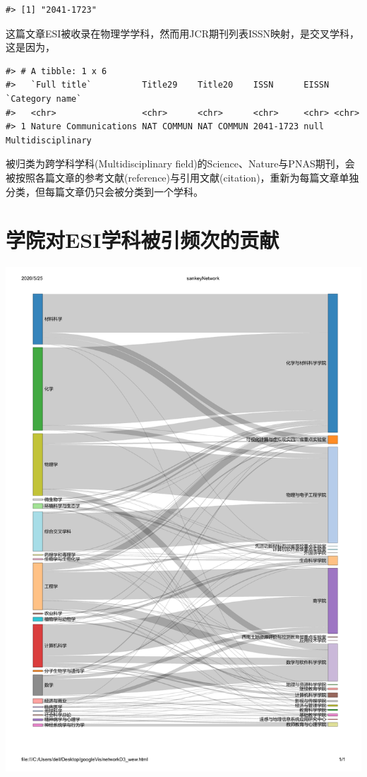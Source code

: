 \documentclass[cn, 11pt, fancy, hide]{elegantbook}
\begin{document}
\begin{verbatim}
#> [1] "2041-1723"
\end{verbatim}

这篇文章ESI被收录在物理学学科，然而用JCR期刊列表ISSN映射，是交叉学科，这是因为，

\begin{verbatim}
#> # A tibble: 1 x 6
#>   `Full title`          Title29    Title20    ISSN      EISSN `Category name`  
#>   <chr>                 <chr>      <chr>      <chr>     <chr> <chr>            
#> 1 Nature Communications NAT COMMUN NAT COMMUN 2041-1723 null  Multidisciplinary
\end{verbatim}

被归类为跨学科学科(Multidisciplinary field)的Science、Nature与PNAS期刊，会被按照各篇文章的参考文献(reference)与引用文献(citation)，重新为每篇文章单独分类，但每篇文章仍只会被分类到一个学科。

\hypertarget{ux5b66ux9662ux5bf9esiux5b66ux79d1ux88abux5f15ux9891ux6b21ux7684ux8d21ux732e}{%
\section{学院对ESI学科被引频次的贡献}\label{ux5b66ux9662ux5bf9esiux5b66ux79d1ux88abux5f15ux9891ux6b21ux7684ux8d21ux732e}}

\begin{center}\includegraphics[width=1\linewidth]{sankeyNetwork/sankeyNetwork} \end{center}
\end{document}

